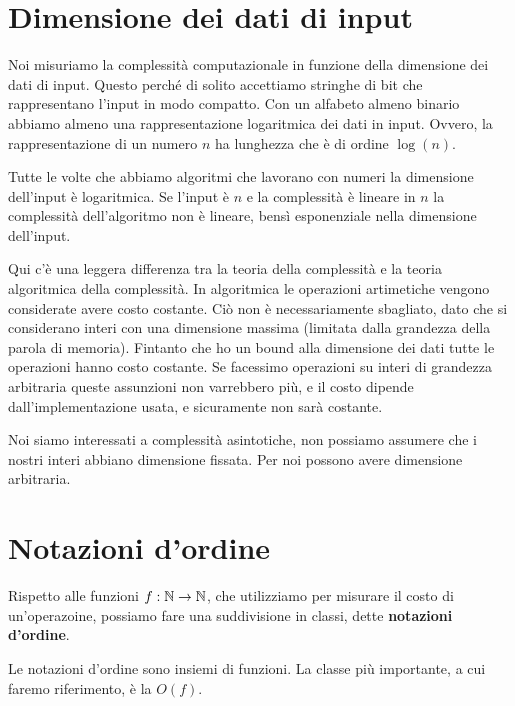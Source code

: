 \section{Dimensione dei dati di input}

Noi misuriamo la complessità computazionale in funzione della dimensione dei dati di input. Questo
perché di solito accettiamo stringhe di bit che rappresentano l'input in modo compatto. Con un
alfabeto almeno binario abbiamo almeno una rappresentazione logaritmica dei dati in input. Ovvero,
la rappresentazione di un numero $n$ ha lunghezza che è di ordine $\log(n)$.

Tutte le volte che abbiamo algoritmi che lavorano con numeri la dimensione dell'input è
logaritmica. Se l'input è $n$ e la complessità è lineare in $n$ la complessità dell'algoritmo
non è lineare, bensì esponenziale nella dimensione dell'input.

Qui c'è una leggera differenza tra la teoria della complessità e la teoria algoritmica della
complessità. In algoritmica le operazioni artimetiche vengono considerate avere costo costante.
Ciò non è necessariamente sbagliato, dato che si considerano interi con una dimensione massima
(limitata dalla grandezza della parola di memoria). Fintanto che ho un bound alla dimensione dei
dati tutte le operazioni hanno costo costante. Se facessimo operazioni su interi di grandezza
arbitraria queste assunzioni non varrebbero più, e il costo dipende dall'implementazione usata, e
sicuramente non sarà costante.

Noi siamo interessati a complessità asintotiche, non possiamo assumere che i nostri interi abbiano
dimensione fissata. Per noi possono avere dimensione arbitraria.

\section{Notazioni d'ordine}

Rispetto alle funzioni $f:\mathbb{N} \to \mathbb{N}$, che utilizziamo per misurare il costo di un'operazoine,
possiamo fare una suddivisione in classi, dette \textbf{notazioni d'ordine}.

Le notazioni d'ordine sono insiemi di funzioni. La classe più importante, a cui faremo riferimento,
è la $O(f)$.

